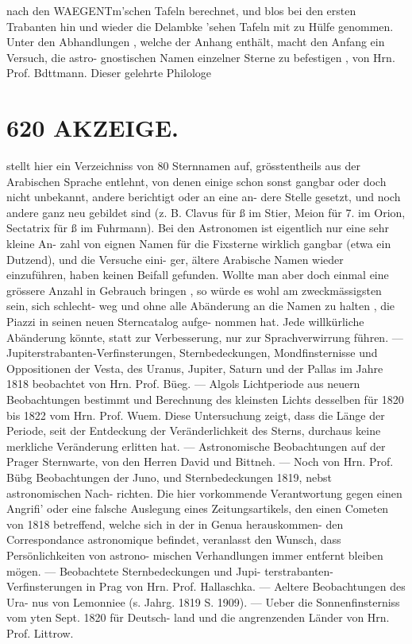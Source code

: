 \documentclass[12pt,a4paper]{article}
\begin{document}
{{{{{{{{nach  den  WAEGENTm'schen  Tafeln  berechnet,  und  blos  bei  den  ersten  Trabanten  hin  und  wieder die  Delambke 'sehen  Tafeln  mit  zu  Hülfe  genommen. Unter  den  Abhandlungen ,  welche  der  Anhang  enthält,  macht  den  Anfang  ein  Versuch,  die  astro- gnostischen  Namen  einzelner  Sterne  zu  befestigen ,  von  Hrn.  Prof.  Bdttmann.     Dieser  gelehrte  Philologe


\section*{620  AKZEIGE.}

stellt  hier  ein  Verzeichniss  von  80  Sternnamen  auf,  grösstentheils  aus  der  Arabischen  Sprache  entlehnt, von  denen  einige  schon  sonst  gangbar  oder  doch  nicht  unbekannt,  andere  berichtigt  oder  an  eine  an- dere Stelle  gesetzt,  und  noch  andere  ganz  neu  gebildet  sind  (z.  B.  Clavus  für  ß  im  Stier,  Meion  für  7. im  Orion,  Sectatrix  für  ß  im  Fuhrmann).  Bei  den  Astronomen  ist  eigentlich  nur  eine  sehr  kleine  An- zahl von  eignen  Namen  für  die  Fixsterne  wirklich  gangbar  (etwa  ein  Dutzend),  und  die  Versuche  eini- ger, ältere  Arabische  Namen  wieder  einzuführen,  haben  keinen  Beifall  gefunden.  Wollte  man  aber  doch einmal  eine  grössere  Anzahl  in  Gebrauch  bringen ,  so  würde  es  wohl  am  zweckmässigsten  sein,  sich  schlecht- weg und  ohne  alle  Abänderung  an  die  Namen  zu  halten ,  die  Piazzi  in  seinen  neuen  Sterncatalog  aufge- nommen hat.  Jede  willkürliche  Abänderung  könnte,  statt  zur  Verbesserung,  nur  zur  Sprachverwirrung führen.  ---  Jupiterstrabanten-Verfinsterungen,  Sternbedeckungen,  Mondfinsternisse  und  Oppositionen  der Vesta,  des  Uranus,  Jupiter,  Saturn  und  der  Pallas  im  Jahre  1818  beobachtet  von  Hrn.  Prof.  Büeg.  --- Algols  Lichtperiode  aus  neuern  Beobachtungen  bestimmt  und  Berechnung  des  kleinsten  Lichts  desselben für  1820  bis  1822  vom  Hrn.  Prof.  Wuem.  Diese  Untersuchung  zeigt,  dass  die  Länge  der  Periode,  seit  der Entdeckung  der  Veränderlichkeit  des  Sterns,  durchaus  keine  merkliche  Veränderung  erlitten  hat.  --- Astronomische  Beobachtungen  auf  der  Prager  Sternwarte,  von  den  Herren  David  und  Bittneh. ---  Noch von  Hrn.  Prof.  Bübg  Beobachtungen  der  Juno,  und  Sternbedeckungen  1819,  nebst  astronomischen  Nach- richten. Die  hier  vorkommende  Verantwortung  gegen  einen  Angrifi'  oder  eine  falsche  Auslegung  eines Zeitungsartikels,  den  einen  Cometen  von  1818  betreffend,  welche  sich  in  der  in  Genua  herauskommen- den Correspondance  astronomique  befindet,  veranlasst  den  Wunsch,  dass  Persönlichkeiten  von  astrono- mischen Verhandlungen  immer  entfernt  bleiben  mögen.  ---  Beobachtete  Sternbedeckungen  und  Jupi- terstrabanten-Verfinsterungen in  Prag  von  Hrn.  Prof.  Hallaschka.  ---  Aeltere  Beobachtungen  des  Ura- nus von  Lemonniee  (s.  Jahrg.  1819  S.  1909).  ---  Ueber  die  Sonnenfinsterniss  vom  yten  Sept.  1820  für  Deutsch- land und  die  angrenzenden  Länder  von  Hrn.  Prof.  Littrow.  }}}}}}}}
\end{document}
